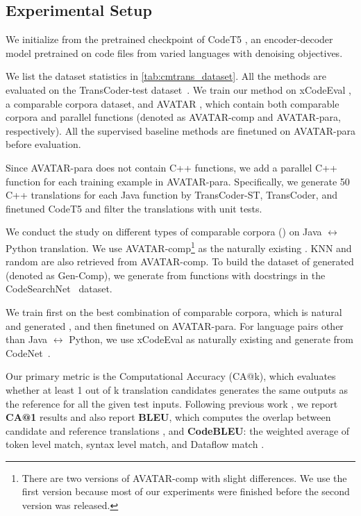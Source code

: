 \subsection{Experimental Setup}
\label{sec:setup}
We initialize \cmtransours from the pretrained checkpoint of CodeT5 \cite{codet5}, an encoder-decoder model pretrained on code files from varied languages with denoising objectives.

We list the dataset statistics in \autoref{tab:cmtrans_dataset}.
All the methods are evaluated on the TransCoder-test dataset~\cite{transcoder}.
We train our method on xCodeEval \cite{xcodeeval}, a comparable corpora dataset, and AVATAR \cite{avatar}, which contain both comparable corpora and parallel functions (denoted as AVATAR-comp and AVATAR-para, respectively).
All the supervised baseline methods are finetuned on AVATAR-para before evaluation.

Since AVATAR-para does not contain C++ functions, we add a parallel C++ function for each training example in AVATAR-para. Specifically, we generate 50 C++ translations for each Java function by TransCoder-ST, TransCoder, and finetuned CodeT5 and filter the translations with unit tests.

We conduct the study on different types of comparable corpora (\CC) on Java $\leftrightarrow$ Python translation.
We use AVATAR-comp\footnote{There are two versions of AVATAR-comp with slight differences. We use the first version because most of our experiments were finished before the second version was released.} as the naturally existing \CC.
KNN and random \CC are also retrieved from AVATAR-comp.
To build the dataset of generated \CC (denoted as Gen-Comp), we generate from functions with docstrings in the CodeSearchNet~\cite{codesearchnet} dataset.

We train \cmtransours first on the best combination of comparable corpora, which is natural and generated \CC, and then finetuned on AVATAR-para.
For language pairs other than Java $\leftrightarrow$ Python, we use xCodeEval as naturally existing \CC and generate \CC from CodeNet~\cite{codenet}. 


Our primary metric is the Computational Accuracy (CA@k), which evaluates whether at least 1 out of k translation candidates generates the same outputs as the reference for all the given test inputs.
Following previous work \cite{avatar}, we report \textbf{CA@1} results and also report \textbf{BLEU}, which computes the overlap between candidate and reference translations \cite{BLEU}, and \textbf{CodeBLEU}: the weighted average of token level match, syntax level match, and Dataflow match \cite{codebleu}.


